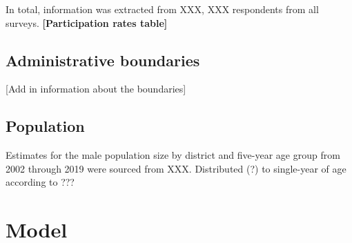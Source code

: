 \documentclass{article}
\begin{document}
\begin{appendix}
In total, information was extracted from XXX, XXX respondents from all surveys.
\textbf{[Participation rates table]}




















\subsection{Administrative boundaries}
\label{sec:org0995c95}


[Add in information about the boundaries] 


\subsection{Population}
\label{sec:org0d7d6e9}


Estimates for the male population size by district and five-year age group from 2002 through 2019 were sourced from XXX. 
Distributed (?) to single-year of age according to ??? 


\section{Model}
\label{sec:org38d457a}


\end{appendix}
\end{document}
